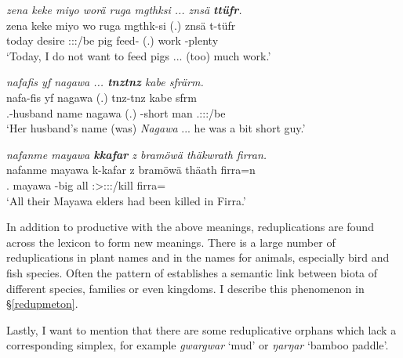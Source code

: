 \begin{exe}
	\ex \emph{zena keke miyo worä ruga mgthksi ... znsä \textbf{ttüfr}.}\\
	\gll zena keke miyo wo ruga mgthk-si (.) znsä t-tüfr\\
	today {\Neg} desire \Fsg:\Sbj:\Nonpast:\Ipfv/be pig feed-{\Nmlz} (.) work \Redup-plenty\\
	\trans `Today, I do not want to feed pigs ... (too) much work.'
	\label{ex709}
\end{exe}
\begin{exe}
	\ex \emph{nafafis yf nagawa ... \textbf{tnztnz} kabe sfrärm.}\\
	\gll nafa-fis yf nagawa (.) tnz-tnz kabe sfrm\\
	\Third.\Poss-husband name nagawa (.) \Redup-short man \Tsg.\Masc:\Sbj:\Pst:\Dur/be\\
	\trans `Her husband's name (was) \emph{Nagawa} ... he was a bit short guy.'\\
	\label{ex710}
\end{exe}
\begin{exe}
	\ex	\emph{nafanme mayawa \textbf{kkafar} z bramöwä thäkwrath firran.}\\
	\gll nafanme mayawa k-kafar z bramöwä thäath firra=n\\
	\Tnsg.{\Poss} mayawa \Redup-big {\Iam} all \Stpl:\Sbj>\Stpl:\Obj:\Pst:\Pfv/kill firra=\Loc\\
	\trans `All their Mayawa elders had been killed in Firra.'
	\label{ex721}
\end{exe}
	
In addition to productive  with the above meanings, reduplications are found across the lexicon to form new meanings. There is a large number of reduplications in plant names and in the names for animals, especially bird and fish species. Often the pattern of  establishes a semantic link between biota of different species, families or even kingdoms. I describe this phenomenon in \S\ref{redupmeton}.

Lastly, I want to mention that there are some reduplicative orphans which lack a corresponding simplex, for example \emph{gwargwar} `mud' or \emph{ŋarŋar} `bamboo paddle'.

